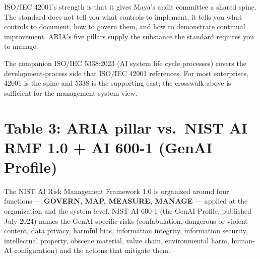 ISO/IEC 42001's strength is that it gives Maya's audit committee a shared spine. The standard does not tell you what controls to implement; it tells you what controls to document, how to govern them, and how to demonstrate continual improvement. ARIA's five pillars supply the substance the standard requires you to manage.

The companion ISO/IEC 5338:2023 (AI system life cycle processes) covers the development-process side that ISO/IEC 42001 references. For most enterprises, 42001 is the spine and 5338 is the supporting cast; the crosswalk above is sufficient for the management-system view.
\stoptwocol

\TNrule

\section*{Table 3: ARIA pillar vs.\ NIST AI RMF 1.0 + AI 600-1 (GenAI Profile)}

\starttwocol
The NIST AI Risk Management Framework 1.0 is organized around four functions --- \textbf{GOVERN, MAP, MEASURE, MANAGE} --- applied at the organization and the system level. NIST AI 600-1 (the GenAI Profile, published July 2024) names the GenAI-specific risks (confabulation, dangerous or violent content, data privacy, harmful bias, information integrity, information security, intellectual property, obscene material, value chain, environmental harm, human-AI configuration) and the actions that mitigate them.

